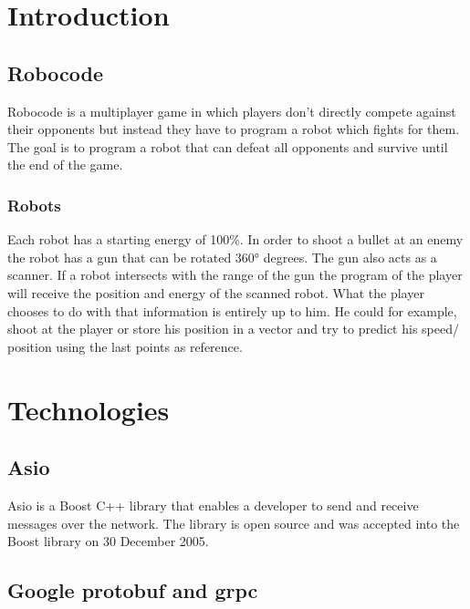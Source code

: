\documentclass[12pt]{report}
\begin{document}

\tableofcontents
\pagebreak

\renewcommand{\thesection}{\arabic{section}}
\section{Introduction}
 
\subsection{Robocode}

Robocode is a multiplayer game in which players don't directly compete against their opponents but instead they have to program a robot which fights for them. The goal is to program a robot that can defeat all opponents and survive until the end of the game.

\subsubsection{Robots}
Each robot has a starting energy of 100\%. In order to shoot a bullet at an enemy the robot has a gun that can be rotated 360° degrees. The gun also acts as a scanner. If a robot intersects with the range of the gun the program of the player will receive the position and energy of the scanned robot. What the player chooses to do with that information is entirely up to him. He could for example, shoot at the player or store his position in a vector and try to predict his speed/ position using the last points as reference.

\section{Technologies}

\subsection{Asio}

Asio is a Boost C++ library that enables a developer to send and receive messages over the network. The library is open source and was accepted into the Boost library on 30 December 2005.

\subsection{Google protobuf and grpc}
\end{document}
